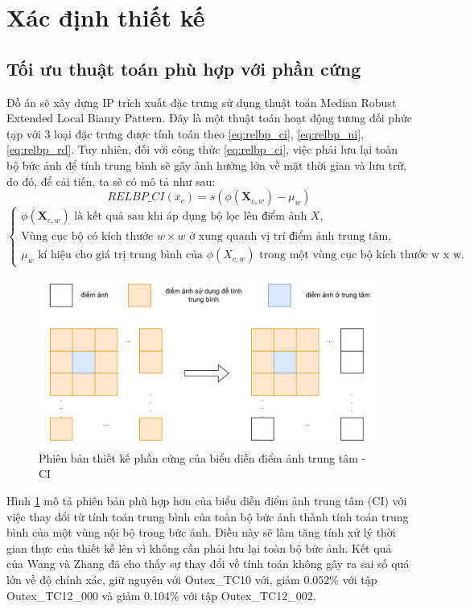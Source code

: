 \section{Xác định thiết kế}
\subsection{Tối ưu thuật toán phù hợp với phần cứng}
Đồ án sẽ xây dựng IP trích xuất đặc trưng sử dụng thuật toán Median Robust Extended Local Bianry Pattern. Đây là một thuật toán hoạt động tương đối phức tạp với 3 loại đặc trưng được tính toán theo \ref{eq:relbp_ci}, \ref{eq:relbp_ni}, \ref{eq:relbp_rd}. Tuy nhiên, đối với công thức \ref{eq:relbp_ci}, việc phải lưu lại toàn bộ bức ảnh để tính trung bình sẽ gây ảnh hưởng lớn về mặt thời gian và lưu trữ, do đó, để cải tiến, ta sẽ có mô tả như sau:
    \begin{equation}
        RELBP\_CI(x_c) = s(\phi(\mathbf{X}_{c, w}) - \mu_w)
         \label{eq:relbp_ci_op}
    \end{equation}
    $\begin{cases}
    \phi(\mathbf{X}_{c,w}) \text{ là kết quả sau khi áp dụng bộ lọc lên điểm ảnh } X, \\
    \text{Vùng cục bộ có kích thước } w \times w \text{ ở xung quanh vị trí điểm ảnh trung tâm}, \\
    \mu_w \text{ kí hiệu cho giá trị trung bình của } \phi(X_{c,w}) \text{ trong một vùng cục bộ kích thước w x w}.
\end{cases}$

\begin{figure} [!hht]
	\centering
	\includegraphics[width=\linewidth]{figures/ciOptimize.png}
	\caption{Phiên bản thiết kế phần cứng của biểu diễn điểm ảnh trung tâm - CI}
	\label{fig:ciOptimize}
\end{figure} 
Hình \ref{fig:ciOptimize} mô tả phiên bản phù hợp hơn của biểu diễn điểm ảnh trung tâm (CI) với việc thay đổi từ tính toán trung bình của toàn bộ bức ảnh thành tính toán trung bình của một vùng nội bộ trong bức ảnh. Điều này sẽ làm tăng tính xử lý thời gian thực của thiết kế lên vì không cần phải lưu lại toàn bộ bức ảnh. Kết quả của Wang và Zhang \cite{realTimeTexture} đã cho thấy sự thay đổi về tính toán không gây ra sai số quá lớn về độ chính xác, giữ nguyên với Outex\_TC10 với, giảm 0.052\% với tập Outex\_TC12\_000 và giảm 0.104\% với tập Outex\_TC12\_002.

